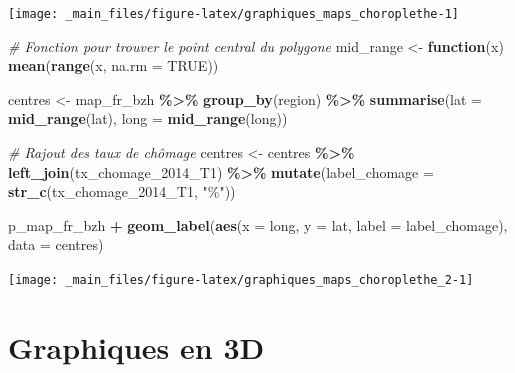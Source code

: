 \documentclass[
  11pt,
]{book}
\newenvironment{Shaded}{\begin{snugshade}}{\end{snugshade}}
\newcommand{\CommentTok}[1]{\textcolor[rgb]{0.56,0.35,0.01}{\textit{#1}}}
\newcommand{\ControlFlowTok}[1]{\textcolor[rgb]{0.13,0.29,0.53}{\textbf{#1}}}
\newcommand{\DataTypeTok}[1]{\textcolor[rgb]{0.13,0.29,0.53}{#1}}
\newcommand{\DecValTok}[1]{\textcolor[rgb]{0.00,0.00,0.81}{#1}}
\newcommand{\KeywordTok}[1]{\textcolor[rgb]{0.13,0.29,0.53}{\textbf{#1}}}
\newcommand{\NormalTok}[1]{#1}
\newcommand{\OperatorTok}[1]{\textcolor[rgb]{0.81,0.36,0.00}{\textbf{#1}}}
\newcommand{\OtherTok}[1]{\textcolor[rgb]{0.56,0.35,0.01}{#1}}
\newcommand{\StringTok}[1]{\textcolor[rgb]{0.31,0.60,0.02}{#1}}
\numberwithin{equation}{section}
\numberwithin{countremarque}{section}
\begin{document}
\begin{center}\texttt{[image: \_main\_files/figure-latex/graphiques\_maps\_choroplethe-1]} \end{center}

\begin{Shaded}
\begin{Highlighting}[]
\CommentTok{\# Fonction pour trouver le point central du polygone}
\NormalTok{mid\_range \textless{}{-}}\StringTok{ }\ControlFlowTok{function}\NormalTok{(x) }\KeywordTok{mean}\NormalTok{(}\KeywordTok{range}\NormalTok{(x, }\DataTypeTok{na.rm =} \OtherTok{TRUE}\NormalTok{))}

\NormalTok{centres \textless{}{-}}\StringTok{ }
\StringTok{  }\NormalTok{map\_fr\_bzh }\OperatorTok{\%\textgreater{}\%}\StringTok{ }
\StringTok{  }\KeywordTok{group\_by}\NormalTok{(region) }\OperatorTok{\%\textgreater{}\%}\StringTok{ }
\StringTok{  }\KeywordTok{summarise}\NormalTok{(}\DataTypeTok{lat =} \KeywordTok{mid\_range}\NormalTok{(lat),}
            \DataTypeTok{long =} \KeywordTok{mid\_range}\NormalTok{(long))}


\CommentTok{\# Rajout des taux de chômage}
\NormalTok{centres \textless{}{-}}\StringTok{ }
\StringTok{  }\NormalTok{centres }\OperatorTok{\%\textgreater{}\%}\StringTok{ }
\StringTok{  }\KeywordTok{left\_join}\NormalTok{(tx\_chomage\_}\DecValTok{2014}\NormalTok{\_T1) }\OperatorTok{\%\textgreater{}\%}\StringTok{ }
\StringTok{  }\KeywordTok{mutate}\NormalTok{(}\DataTypeTok{label\_chomage =} \KeywordTok{str\_c}\NormalTok{(tx\_chomage\_}\DecValTok{2014}\NormalTok{\_T1, }\StringTok{"\%"}\NormalTok{))}

\NormalTok{p\_map\_fr\_bzh }\OperatorTok{+}\StringTok{ }
\StringTok{  }\KeywordTok{geom\_label}\NormalTok{(}\KeywordTok{aes}\NormalTok{(}\DataTypeTok{x =}\NormalTok{ long, }\DataTypeTok{y =}\NormalTok{ lat, }\DataTypeTok{label =}\NormalTok{ label\_chomage),}
             \DataTypeTok{data =}\NormalTok{ centres)}
\end{Highlighting}
\end{Shaded}

\begin{center}\texttt{[image: \_main\_files/figure-latex/graphiques\_maps\_choroplethe\_2-1]} \end{center}

\hypertarget{graphiques_3d}{%
\section{Graphiques en 3D}\label{graphiques_3d}}
\end{document}

